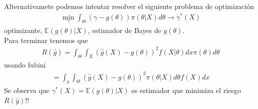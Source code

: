 \documentclass[10pt]{article}
\theoremstyle{plain}
\theoremstyle{definition}
\begin{document}
\begin{etaremune}
Alternativamete podemos intentar resolver el siguiente problema de optimización
\begin{align*}
\min_{\gamma}\int_{\Theta}(\gamma-g(\theta))\pi(\theta|X)d\theta \rightarrow \gamma^{*}(X)
\end{align*}
optimizante, $\mathbb{E}(g(\theta)|X)$, estimador de Bayes de $g(\theta)$.\\

Para terminar tenemos que
\begin{align*}
R(\hat{g}) = \int_{\Theta}\int_{\mathfrak{X}}(\hat{g}(X)-g(\theta))^2f(X|\theta)dx\pi(\theta)d\theta
\end{align*}
usando fubini
\begin{align*}
= \int_{\mathfrak{x}}\int_{\Theta}(\hat{g}(X)-g(\theta))^2\pi(\theta|X)d\theta f(X)dx
\end{align*}
Se observa que $\gamma^*(X) = \mathbb{E}(g(\theta)|X)$ es estimador que minimiza el riesgo $R(\hat{y})$!!
\end{etaremune}
\end{document}
